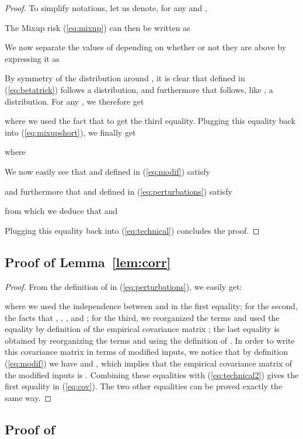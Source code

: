 \documentclass[twoside,11pt]{article}
\begin{document}
\begin{proof}
To simplify notations, let us denote, for any  and ,

The Mixup risk (\ref{eq:mixup}) can then be written as

We now separate the values of  depending on whether or not they are above  by expressing it as

By symmetry of the  distribution around , it is clear that  defined in (\ref{eq:betatrick}) follows a  distribution, and furthermore that  follows, like , a  distribution. For any , we therefore get

where we used the fact that  to get the third equality. Plugging this equality back into (\ref{eq:mixupshort}), we finally get

where

We now easily see that  and  defined in (\ref{eq:modif}) satisfy

and furthermore that  and  defined in (\ref{eq:perturbations}) satisfy

from which we deduce that  and

Plugging this equality back into (\ref{eq:technical}) concludes the proof.
\end{proof}


\subsection{Proof of Lemma~\ref{lem:corr}}

\begin{proof}
From the definition of  in (\ref{eq:perturbations}), we easily get:

where we used the independence between  and  in the first equality; for the second, the facts that , , , and ; for the third, we reorganized the terms and used the equality  by definition of the empirical covariance matrix ; the last equality is obtained by reorganizing the terms and using the definition of . In order to write this covariance matrix in terms of modified inputs, we notice that by definition (\ref{eq:modif}) we have  and , which implies that the empirical covariance matrix of the modified inputs is . Combining these equalities with (\ref{eq:technical2}) gives the first equality in (\ref{eq:cov}). The two other equalities can be proved exactly the same way.
\end{proof}

\subsection{Proof of }
\end{document}
